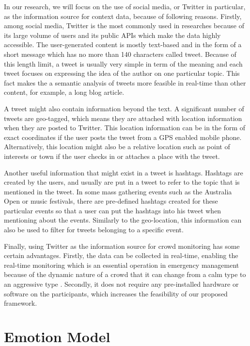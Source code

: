 In our research, we will focus on the use of social media, or Twitter in particular, as the information source for context data, because of following reasons. Firstly, among social media, Twitter is the most commonly used in researches because of its large volume of users and its public APIs which make the data highly accessible. The user-generated content is mostly text-based and in the form of a short message which has no more than 140 characters called tweet. Because of this length limit, a tweet is usually very simple in term of the meaning and each tweet focuses on expressing the idea of the author on one particular topic. This fact makes the a semantic analysis of tweets more feasible in real-time than other content, for example, a long blog article.

A tweet might also contain information beyond the text. A significant number of tweets are geo-tagged, which means they are attached with location information when they are posted to Twitter. This location information can be in the form of exact coordinates if the user posts the tweet from a GPS enabled mobile phone. Alternatively, this location might also be a relative location such as point of interests or town if the user checks in or attaches a place with the tweet.

Another useful information that might exist in a tweet is hashtags. Hashtags are created by the users, and usually are put in a tweet to refer to the topic that is mentioned in the tweet. In some mass gathering events such as the Australia Open or music festivals, there are pre-defined hashtags created for these particular events so that a user can put the hashtags into his tweet when mentioning about the events. Similarly to the geo-location, this information can also be used to filter for tweets belonging to a specific event.

Finally, using Twitter as the information source for crowd monitoring has some certain advantages. Firstly, the data can be collected in real-time, enabling the real-time monitoring which is an essential operation in emergency management because of the dynamic nature of a crowd that it can change from a calm type to an aggressive type \citep{Berlonghi1995}. Secondly, it does not require any pre-installed hardware or software on the participants, which increases the feasibility of our proposed framework.

\section{Emotion Model}

